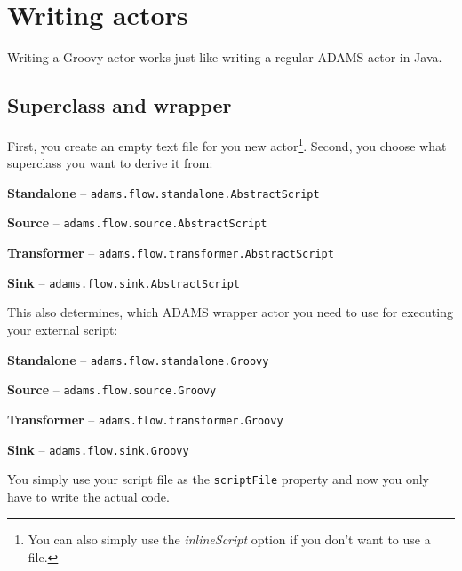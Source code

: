 \documentclass[a4paper]{book}
\begin{document}
\chapter{Writing actors}
Writing a Groovy actor works just like writing a regular ADAMS actor in Java.

\section{Superclass and wrapper}
First, you create an empty text file for you new 
actor\footnote{You can also simply use the \textit{inlineScript} option if you don't 
want to use a file.}. Second, you choose what superclass you want to derive it from:
\begin{tight_itemize}
	\item \textbf{Standalone} -- \texttt{adams.flow.standalone.AbstractScript}
	\item \textbf{Source} -- \texttt{adams.flow.source.AbstractScript}
	\item \textbf{Transformer} -- \texttt{adams.flow.transformer.AbstractScript}
	\item \textbf{Sink} -- \texttt{adams.flow.sink.AbstractScript}
\end{tight_itemize}
This also determines, which ADAMS wrapper actor you need to use for executing
your external script:
\begin{tight_itemize}
	\item \textbf{Standalone} -- \texttt{adams.flow.standalone.Groovy}
	\item \textbf{Source} -- \texttt{adams.flow.source.Groovy}
	\item \textbf{Transformer} -- \texttt{adams.flow.transformer.Groovy}
	\item \textbf{Sink} -- \texttt{adams.flow.sink.Groovy}
\end{tight_itemize}
You simply use your script file as the \texttt{scriptFile} property and now you
only have to write the actual code.

\newpage
\end{document}
